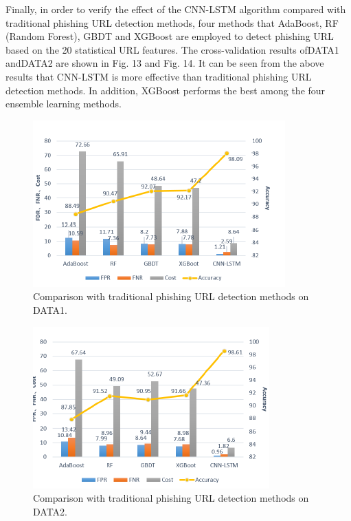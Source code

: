 \documentclass{ieeeaccess}
\begin{document}
\par Finally, in order to verify the effect of the CNN-LSTM
algorithm compared with traditional phishing URL detection
methods, four methods that AdaBoost, RF (Random Forest),
GBDT and XGBoost are employed to detect phishing URL
based on the 20 statistical URL features. The cross-validation
results ofDATA1 andDATA2 are shown in Fig. 13 and Fig. 14.
It can be seen from the above results that CNN-LSTM is
more effective than traditional phishing URL detection methods.
In addition, XGBoost performs the best among the four
ensemble learning methods.

\begin{figure}
    \centering
    \includegraphics[width=\linewidth]{figure13.png}
    \caption{Comparison with traditional phishing URL detection methods
on DATA1.}
    \label{fig:13}
\end{figure}

\begin{figure}
    \centering
    \includegraphics[width=\linewidth]{figure14.png}
    \caption{Comparison with traditional phishing URL detection methods
on DATA2.}
    \label{fig:14}
\end{figure}
\end{document}
